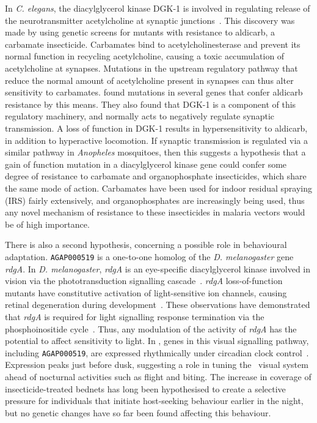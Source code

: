 \begin{refsection}
In \textit{C. elegans}, the diacylglycerol kinase DGK-1 is involved in regulating release of the neurotransmitter acetylcholine at synaptic junctions~\parencite{Miller1999}.
%
This discovery was made by using genetic screens for mutants with resistance to aldicarb, a carbamate insecticide.
%
Carbamates bind to acetylcholinesterase and prevent its normal function in recycling acetylcholine, causing a toxic accumulation of acetylcholine at synapses.
%
Mutations in the upstream regulatory pathway that reduce the normal amount of acetylcholine present in synapses can thus alter sensitivity to carbamates.
%
\textcite{Miller1999} found mutations in several genes that confer aldicarb resistance by this means.
%
They also found that DGK-1 is a component of this regulatory machinery, and normally acts to negatively regulate synaptic transmission.
%
A loss of function in DGK-1 results in hypersensitivity to aldicarb, in addition to hyperactive locomotion.
%
If synaptic transmission is regulated via a similar pathway in \textit{Anopheles} mosquitoes, then this suggests a hypothesis that a gain of function mutation in a diacylglycerol kinase gene could confer some degree of resistance to carbamate and organophosphate insecticides, which share the same mode of action.
%
Carbamates have been used for indoor residual spraying (IRS) fairly extensively, and organophosphates are increasingly being used, thus any novel mechanism of resistance to these insecticides in malaria vectors would be of high importance.


There is also a second hypothesis, concerning a possible role in behavioural adaptation.
%
\texttt{AGAP000519} is a one-to-one homolog of the \textit{D. melanogaster} gene \textit{rdgA}.
%
In \textit{D. melanogaster}, \textit{rdgA} is an eye-specific diacylglycerol kinase involved in vision via the phototransduction signalling cascade~\parencite{Masai1993}.
%
\textit{rdgA} loss-of-function mutants have constitutive activation of light-sensitive ion channels, causing retinal degeneration during development~\parencite{Raghu2000}.
%
These observations have demonstrated that \textit{rdgA} is required for light signalling response termination via the phosphoinositide cycle~\parencite{Katz2009}.
%
Thus, any modulation of the activity of \textit{rdgA} has the potential to affect sensitivity to light.
%
In \agam, genes in this visual signalling pathway, including \texttt{AGAP000519}, are expressed rhythmically under circadian clock control~\parencite{Rund2011}.
%
Expression peaks just before dusk, suggesting a role in tuning the \agam\ visual system ahead of nocturnal activities such as flight and biting.
%
The increase in coverage of insecticide-treated bednets has long been hypothesised to create a selective pressure for individuals that initiate host-seeking behaviour earlier in the night, but no genetic changes have so far been found affecting this behaviour.
%



\end{refsection}
